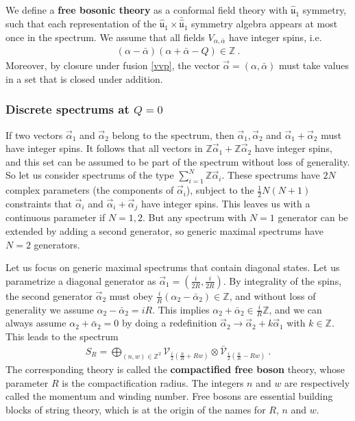 \documentclass[12pt, a4paper, notitlepage, twoside]{report}
\numberwithin{equation}{section}
\theoremstyle{break}
\begin{document}
We define a \textbf{\boldmath free bosonic theory} as a conformal field theory with $\hat{\mathfrak{u}}_1$ symmetry, such that each representation of the $\hat{\mathfrak{u}}_1 \times \bar{\hat{\mathfrak{u}}}_1$ symmetry algebra appears at most once in the spectrum. We assume that all fields $V_{\alpha,\bar\alpha}$ have integer spins, i.e. 
\begin{align}
 (\alpha-\bar\alpha)(\alpha+\bar\alpha-Q)\in\mathbb{Z}\ . 
\end{align}
Moreover, by closure under fusion \eqref{vvp}, the vector $\vec\alpha = (\alpha,\bar\alpha)$ must take values in a set that is closed under addition.

\subsubsection{Discrete spectrums at $Q=0$}

If two vectors $\vec\alpha_1$ and $\vec\alpha_2$ belong to the spectrum, then $\vec\alpha_1,\vec\alpha_2$ and $\vec\alpha_1+\vec\alpha_2$ must have integer spins.
It follows that all vectors in $\mathbb{Z}\vec\alpha_1 + \mathbb{Z}\vec\alpha_2$ have integer spins, and this set can be assumed to be part of the spectrum without loss of generality. 
So let us consider spectrums of the type $\sum_{i=1}^N \mathbb{Z}\vec \alpha_i$. 
These spectrums have $2N$ complex parameters (the components of $\vec\alpha_i$), subject to the $\frac12 N(N+1)$ constraints that $\vec\alpha_i$ and $\vec\alpha_i+\vec\alpha_j$ have integer spins. 
This leaves us with a continuous parameter if $N=1,2$. But any spectrum with $N=1$ generator can be extended by adding a second generator, so generic maximal spectrums have $N=2$ generators.

Let us focus on generic maximal spectrums that contain diagonal states. 
Let us parametrize a diagonal generator as  $\vec\alpha_1=(\frac{i}{2R},\frac{i}{2R})$. By integrality of the spins, the second generator $\vec\alpha_2$ must obey $\frac{i}{R}(\alpha_2-\bar\alpha_2)\in\mathbb{Z}$, and without loss of generality we assume $\alpha_2-\bar\alpha_2=iR$. This implies $\alpha_2+\bar\alpha_2 \in \frac{i}{R}\mathbb{Z}$, and we can always assume $\alpha_2+\bar\alpha_2=0$ by doing a redefinition $\vec\alpha_2\to \vec\alpha_2+k\vec\alpha_1$ with $k\in\mathbb{Z}$. This leads to the spectrum
\begin{align}
 \boxed{S_R = \bigoplus_{(n,w)\in {\mathbb{Z}^2}} \mathcal{V}_{\frac{i}{2}\left(\frac{n}{R} + Rw\right)} \otimes \bar{\mathcal{V}}_{\frac{i}{2}\left(\frac{n}{R} - Rw\right)} }\ .
\label{sr}
\end{align}
The corresponding theory is called the \textbf{\boldmath compactified free boson} theory, whose parameter $R$ is  the compactification radius.
The integers $n$ and $w$ are respectively called the momentum and winding number.
Free bosons are essential building blocks of string theory, which is at the origin of the names for $R$, $n$ and $w$.
\end{document}
